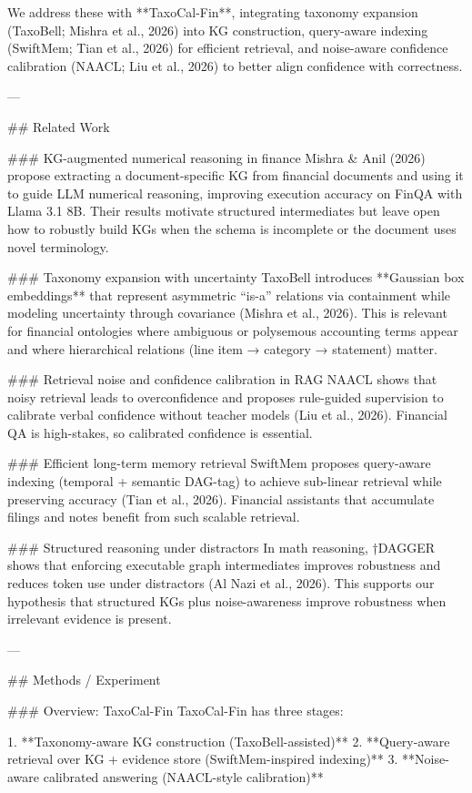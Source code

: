 We address these with **TaxoCal-Fin**, integrating taxonomy expansion (TaxoBell; Mishra et al., 2026) into KG construction, query-aware indexing (SwiftMem; Tian et al., 2026) for efficient retrieval, and noise-aware confidence calibration (NAACL; Liu et al., 2026) to better align confidence with correctness.

---

## Related Work  

### KG-augmented numerical reasoning in finance  
Mishra & Anil (2026) propose extracting a document-specific KG from financial documents and using it to guide LLM numerical reasoning, improving execution accuracy on FinQA with Llama 3.1 8B. Their results motivate structured intermediates but leave open how to robustly build KGs when the schema is incomplete or the document uses novel terminology.

### Taxonomy expansion with uncertainty  
TaxoBell introduces **Gaussian box embeddings** that represent asymmetric “is-a” relations via containment while modeling uncertainty through covariance (Mishra et al., 2026). This is relevant for financial ontologies where ambiguous or polysemous accounting terms appear and where hierarchical relations (line item → category → statement) matter.

### Retrieval noise and confidence calibration in RAG  
NAACL shows that noisy retrieval leads to overconfidence and proposes rule-guided supervision to calibrate verbal confidence without teacher models (Liu et al., 2026). Financial QA is high-stakes, so calibrated confidence is essential.

### Efficient long-term memory retrieval  
SwiftMem proposes query-aware indexing (temporal + semantic DAG-tag) to achieve sub-linear retrieval while preserving accuracy (Tian et al., 2026). Financial assistants that accumulate filings and notes benefit from such scalable retrieval.

### Structured reasoning under distractors  
In math reasoning, †DAGGER shows that enforcing executable graph intermediates improves robustness and reduces token use under distractors (Al Nazi et al., 2026). This supports our hypothesis that structured KGs plus noise-awareness improve robustness when irrelevant evidence is present.

---

## Methods / Experiment  

### Overview: TaxoCal-Fin  
TaxoCal-Fin has three stages:

1. **Taxonomy-aware KG construction (TaxoBell-assisted)**  
2. **Query-aware retrieval over KG + evidence store (SwiftMem-inspired indexing)**  
3. **Noise-aware calibrated answering (NAACL-style calibration)**

